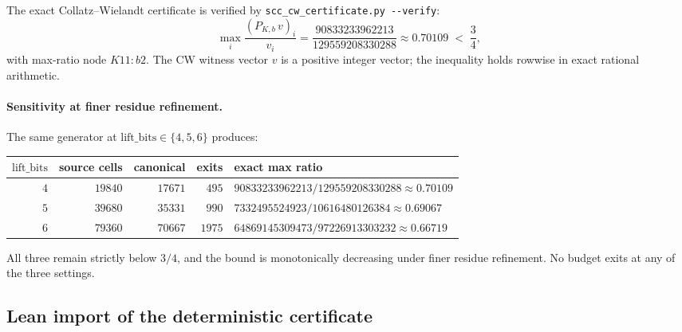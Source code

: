\documentclass[11pt,a4paper]{article}
\theoremstyle{definition}
\begin{document}
The exact Collatz--Wielandt certificate is verified by
\verb|scc_cw_certificate.py --verify|:
\[
\boxed{\;
  \max_i \frac{(P_{K,b}\, v)_i}{v_i}
  = \frac{90833233962213}{129559208330288}
  \approx 0.70109
  \;<\;
  \frac{3}{4},
  \;}
\]
with max-ratio node $K11\!:\!b2$. The CW witness vector $v$ is a
positive integer vector; the inequality holds rowwise in exact
rational arithmetic.

\paragraph{Sensitivity at finer residue refinement.}
The same generator at
$\mathrm{lift\_bits} \in \{4, 5, 6\}$ produces:
\begin{center}
\begin{tabular}{rrrrl}
\toprule
$\mathrm{lift\_bits}$ & source cells & canonical & exits &
exact max ratio \\
\midrule
$4$ & $19840$ & $17671$ & $495$  &
$90833233962213/129559208330288 \approx 0.70109$ \\
$5$ & $39680$ & $35331$ & $990$  &
$7332495524923/10616480126384 \approx 0.69067$ \\
$6$ & $79360$ & $70667$ & $1975$ &
$64869145309473/97226913303232 \approx 0.66719$ \\
\bottomrule
\end{tabular}
\end{center}
All three remain strictly below $3/4$, and the bound is
monotonically decreasing under finer residue refinement. No
budget exits at any of the three settings.

\subsection{Lean import of the deterministic certificate}
\label{sec:deterministic-lean}
\end{document}
